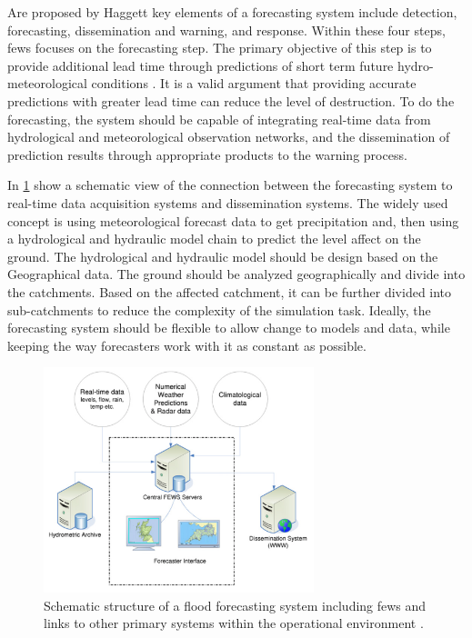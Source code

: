 Are proposed by Haggett \cite{Haggett1998AnWales} key elements of a forecasting system include detection, forecasting, dissemination and warning, and response. Within these four steps, \acrshort{fews} focuses on the forecasting step. The primary objective of this step is to provide additional lead time through predictions of short term future hydro-meteorological conditions \cite{Werner2005FloodCatchments}. It is a valid argument that providing accurate predictions with greater lead time can reduce the level of destruction. To do the forecasting, the system should be capable of integrating real-time data from hydrological and meteorological observation networks, and the dissemination of prediction results through appropriate products to the warning process.

In  \cref{fi:fews_schematic} show a schematic view of the connection between the forecasting system to real-time data acquisition systems and dissemination systems. The widely used concept is using meteorological forecast data to get precipitation and, then using a hydrological and hydraulic model chain to predict the level affect on the ground. The hydrological and hydraulic model should be design based on the Geographical data. The ground should be analyzed geographically and divide into the catchments. Based on the affected catchment, it can be further divided into sub-catchments to reduce the complexity of the simulation task. Ideally, the forecasting system should be flexible to allow change to models and data, while keeping the way forecasters work with it as constant as possible.

\begin{figure}[htp]
    \centering
    \includegraphics[width=0.7\textwidth]{lit/fews/Schematic-structure-of-a-fl-ood-forecasting-system-showing-the-position-of-Delft-FEWS_W640.png}
    \caption[Schematic structure of a flood forecasting system including \acrshort{fews} and links to other primary systems within the operational environment]{Schematic structure of a flood forecasting system including \acrshort{fews} and links to other primary systems within the operational environment \cite{Werner2013TheSystem}.}
    \label{fi:fews_schematic}
\end{figure}

